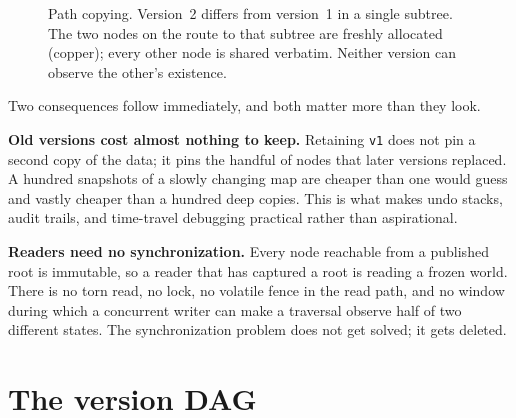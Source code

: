 \documentclass[11pt,twoside,openright]{book}
\newcommand{\code}[1]{\texorpdfstring{\textcolor{d7ink}{\texttt{#1}}}{#1}}
\begin{document}
\begin{figure}[htbp]
\centering
{}
\caption{Path copying. Version~2 differs from version~1 in a single subtree.
The two nodes on the route to that subtree are freshly allocated (copper); every
other node is shared verbatim. Neither version can observe the other's
existence.}
\label{fig:pathcopy}
\end{figure}

Two consequences follow immediately, and both matter more than they look.

\textbf{Old versions cost almost nothing to keep.} Retaining \code{v1} does not
pin a second copy of the data; it pins the handful of nodes that later versions
replaced. A hundred snapshots of a slowly changing map are cheaper than one
would guess and vastly cheaper than a hundred deep copies. This is what makes
undo stacks, audit trails, and time-travel debugging practical rather than
aspirational.

\textbf{Readers need no synchronization.} Every node reachable from a published
root is immutable, so a reader that has captured a root is reading a frozen
world. There is no torn read, no lock, no volatile fence in the read path, and
no window during which a concurrent writer can make a traversal observe half of
two different states. The synchronization problem does not get solved; it gets
deleted.

\section{The version DAG}
\end{document}
